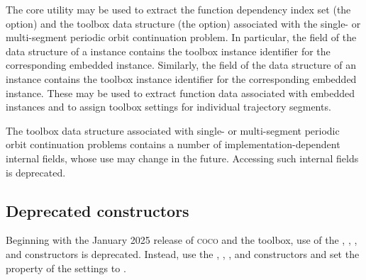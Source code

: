 The  core utility may be used to extract the function dependency index set (the  option) and the toolbox data structure (the  option) associated with the single- or multi-segment periodic orbit continuation problem. In particular, the  field of the data structure of a  instance contains the toolbox instance identifier for the corresponding embedded  instance. Similarly, the  field of the data structure of an  instance contains the toolbox instance identifier for the corresponding embedded  instance. These may be used to extract function data associated with embedded  instances and to assign  toolbox settings for individual trajectory segments.

The toolbox data structure associated with single- or multi-segment periodic orbit continuation problems contains a number of implementation-dependent internal fields, whose use may change in the future. Accessing such internal fields is deprecated.

\subsection{Deprecated constructors}
Beginning with the January 2025 release of \textsc{coco} and the  toolbox, use of the , , , and  constructors is deprecated. Instead, use the , , , and  constructors and set the  property of the  settings to .

